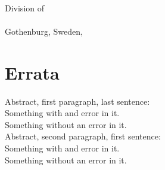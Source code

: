 \documentclass[10pt,a4paper,onecolumn,english]{book}
\begin{document}
\frontmatter

\begin{center} \LARGE \mytitle\\
\vspace{5mm}
\textsc{\large\authorname} \\
\vspace{5mm}
\end{center}

\pagestyle{empty}

\noindent
\mydepartment\\
Division of \division \\
\chalandgu\\
Gothenburg, Sweden, \currentyear\\

\section*{Errata}

\vspace{3cm}

\newcommand{\errata}[3]{
\noindent
#1:\\
\hspace*{16pt}#2\\
\hspace*{16pt}\textrightarrow\quad #3
\\[2mm]
}

\errata{Abstract, first paragraph, last sentence}{Something with and error in it.}{Something without an error in it.}
\errata{Abstract, second paragraph, first sentence}{Something with and error in it.}{Something without an error in it.}
\end{document}
